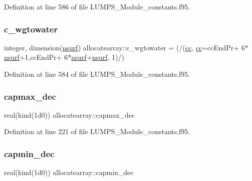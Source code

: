 Definition at line 586 of file L\+U\+M\+P\+S\+\_\+\+Module\+\_\+constants.\+f95.

\mbox{\label{namespaceallocatearray_a6cd7170de2066ae2e7f5a86d11d95c78}} 
\subsubsection{\texorpdfstring{c\+\_\+wgtowater}{c\_wgtowater}}
{\footnotesize\ttfamily integer, dimension(\hyperlink{namespaceallocatearray_acd22f92a06f7e9a2a91426b3dc99fdb0}{nsurf}) allocatearray\+::c\+\_\+wgtowater = (/(\hyperlink{namespaceallocatearray_ac863c81704eb507dee10f5e10741e10c}{cc}, \hyperlink{namespaceallocatearray_ac863c81704eb507dee10f5e10741e10c}{cc}=cc\+End\+Pr+ 6$\ast$\hyperlink{namespaceallocatearray_acd22f92a06f7e9a2a91426b3dc99fdb0}{nsurf}+1,cc\+End\+Pr+ 6$\ast$\hyperlink{namespaceallocatearray_acd22f92a06f7e9a2a91426b3dc99fdb0}{nsurf}+\hyperlink{namespaceallocatearray_acd22f92a06f7e9a2a91426b3dc99fdb0}{nsurf}, 1)/)}



Definition at line 584 of file L\+U\+M\+P\+S\+\_\+\+Module\+\_\+constants.\+f95.

\mbox{\label{namespaceallocatearray_a9efd342ce550303baf767c606737959f}} 
\subsubsection{\texorpdfstring{capmax\+\_\+dec}{capmax\_dec}}
{\footnotesize\ttfamily real(kind(1d0)) allocatearray\+::capmax\+\_\+dec}



Definition at line 221 of file L\+U\+M\+P\+S\+\_\+\+Module\+\_\+constants.\+f95.

\mbox{\label{namespaceallocatearray_a618a159ee64457fbf327e9bed8a0f942}} 
\subsubsection{\texorpdfstring{capmin\+\_\+dec}{capmin\_dec}}
{\footnotesize\ttfamily real(kind(1d0)) allocatearray\+::capmin\+\_\+dec}



